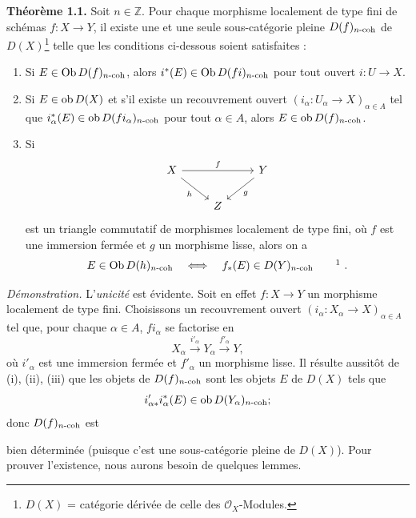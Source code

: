 \documentclass[11pt]{article}
\begin{document}
\textbf{Théorème 1.1.} Soit \(n\in\mathbb Z\). Pour chaque morphisme localement de type fini de schémas \(f:X\longrightarrow Y\), il existe une et une seule sous-catégorie pleine \(D(f)_{n\text{-}\mathrm{coh}}\) de \(D(X)\)\footnote{\(D(X)\) = catégorie dérivée de celle des \(\mathcal O_X\)-Modules.} telle que les conditions ci-dessous soient satisfaites :
\begin{enumerate}[label=(\roman*)]
\item Si \(E\in\operatorname{Ob} D(f)_{n\text{-}\mathrm{coh}}\), alors \(i^*(E)\in\operatorname{Ob} D(fi)_{n\text{-}\mathrm{coh}}\) pour tout ouvert \(i:U\to X\).

\item Si \(E\in\operatorname{ob} D(X)\) et s'il existe un recouvrement ouvert \((i_\alpha:U_\alpha\to X)_{\alpha\in A}\) tel que \(i_\alpha^*(E)\in\operatorname{ob} D(fi_\alpha)_{n\text{-}\mathrm{coh}}\) pour tout \(\alpha\in A\), alors \(E\in\operatorname{ob} D(f)_{n\text{-}\mathrm{coh}}\).

\item Si
\[
\begin{tikzcd}
X \arrow[rr,"f"] \arrow[dr,"h"'] & & Y \arrow[dl,"g"]\\
& Z &
\end{tikzcd}
\]
est un triangle commutatif de morphismes localement de type fini, où \(f\) est une immersion fermée et \(g\) un morphisme lisse, alors on a
\[
  E\in\Ob D(h)_{n\text{-}\coh}
  \quad\Longleftrightarrow\quad
  f_*(E)\in D(Y)_{n\text{-}\coh}\qquad\mbox{\footnotemark}\ .
\]
\end{enumerate}

\emph{Démonstration.} L'\emph{unicité} est évidente. Soit en effet \(f:X\to Y\) un morphisme localement de type fini. Choisissons un recouvrement ouvert \((i_\alpha:X_\alpha\to X)_{\alpha\in A}\) tel que, pour chaque \(\alpha\in A\), \(fi_\alpha\) se factorise en
\[
  X_\alpha\xrightarrow{i'_\alpha}Y_\alpha\xrightarrow{f'_\alpha}Y,
\]
où \(i'_\alpha\) est une immersion fermée et \(f'_\alpha\) un morphisme lisse. Il résulte aussitôt de (i), (ii), (iii) que les objets de \(D(f)_{n\text{-}\mathrm{coh}}\) sont les objets \(E\) de \(D(X)\) tels que
\[
  i'_{\alpha *}i_\alpha^*(E)\in \operatorname{ob} D(Y_\alpha)_{n\text{-}\mathrm{coh}};
\]
donc \(D(f)_{n\text{-}\mathrm{coh}}\) est

bien déterminée (puisque c'est une sous-catégorie pleine de \(D(X)\)). Pour prouver l'existence, nous aurons besoin de quelques lemmes.
\end{document}
